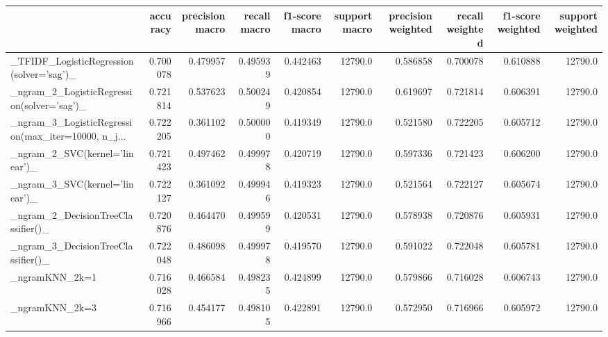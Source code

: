 \begin{tabular}{lrrrrrrrrr}
\toprule
{} &  accuracy &  precision macro &  recall macro &  f1-score macro &  support macro &  precision weighted &  recall weighted &  f1-score weighted &  support weighted \\
\midrule
\_TFIDF\_LogisticRegression(solver='sag')\_           &  0.700078 &         0.479957 &      0.495939 &        0.442463 &        12790.0 &            0.586858 &         0.700078 &           0.610888 &           12790.0 \\
\_ngram\_2\_LogisticRegression(solver='sag')\_         &  0.721814 &         0.537623 &      0.500249 &        0.420854 &        12790.0 &            0.619697 &         0.721814 &           0.606391 &           12790.0 \\
\_ngram\_3\_LogisticRegression(max\_iter=10000, n\_j... &  0.722205 &         0.361102 &      0.500000 &        0.419349 &        12790.0 &            0.521580 &         0.722205 &           0.605712 &           12790.0 \\
\_ngram\_2\_SVC(kernel='linear')\_                     &  0.721423 &         0.497462 &      0.499978 &        0.420719 &        12790.0 &            0.597336 &         0.721423 &           0.606200 &           12790.0 \\
\_ngram\_3\_SVC(kernel='linear')\_                     &  0.722127 &         0.361092 &      0.499946 &        0.419323 &        12790.0 &            0.521564 &         0.722127 &           0.605674 &           12790.0 \\
\_ngram\_2\_DecisionTreeClassifier()\_                 &  0.720876 &         0.464470 &      0.499599 &        0.420531 &        12790.0 &            0.578938 &         0.720876 &           0.605931 &           12790.0 \\
\_ngram\_3\_DecisionTreeClassifier()\_                 &  0.722048 &         0.486098 &      0.499978 &        0.419570 &        12790.0 &            0.591022 &         0.722048 &           0.605781 &           12790.0 \\
\_ngramKNN\_2k=1                                     &  0.716028 &         0.466584 &      0.498235 &        0.424899 &        12790.0 &            0.579866 &         0.716028 &           0.606743 &           12790.0 \\
\_ngramKNN\_2k=3                                     &  0.716966 &         0.454177 &      0.498105 &        0.422891 &        12790.0 &            0.572950 &         0.716966 &           0.605972 &           12790.0 \\

\end{tabular}
